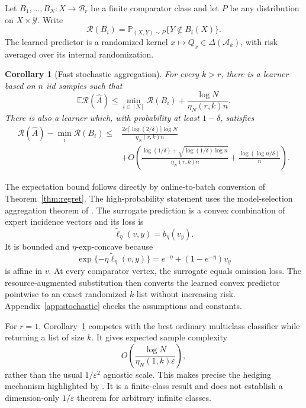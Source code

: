 \documentclass{article}
\newtheorem{corollary}[theorem]{Corollary}
\theoremstyle{definition}
\theoremstyle{remark}
\newcommand{\E}{\mathbb E}
\newcommand{\Pp}{\mathbb P}
\newcommand{\cA}{\mathcal A}
\newcommand{\cY}{\mathcal Y}
\newcommand{\cB}{\mathcal B}
\newcommand{\DeltaS}{\Delta}
\newcommand{\1}{\mathbf 1}
\newcommand{\risk}{\mathcal R}
\begin{document}
Let \(B_1,\ldots,B_N:X\to\cB_r\) be a finite comparator class and let \(P\) be any distribution on \(X\times\cY\). Write \[ \risk(B_i)=\Pp_{(X,Y)\sim P}\{Y\notin B_i(X)\}. \] The learned predictor is a randomized kernel \(x\mapsto Q_x\in\DeltaS(\cA_k)\), with risk averaged over its internal randomization.

\begin{corollary}[Fast stochastic aggregation]
\label{cor:stochastic}
For every \(k>r\), there is a learner based on \(n\) iid samples such that
\begin{equation}
\label{eq:expected-fast}
\E\risk(\widehat A)
\le\min_{i\in[N]}\risk(B_i)
+\frac{\log N}{\eta_N(r,k)n}.
\end{equation}
There is also a learner which, with probability at least \(1-\delta\), satisfies
\begin{align}
\risk(\widehat A)-\min_i\risk(B_i)
\le {}&
\frac{2e\lceil\log(2/\delta)\rceil\log N}
{\eta_N(r,k)n}
\nonumber\\
&+O\left(
\frac{\log(1/\delta)+\sqrt{\log(1/\delta)\log n}}
{\eta_N(r,k)n}
+\frac{\log(\log n/\delta)}n
\right).
\label{eq:highprob-fast}
\end{align}
\end{corollary}

The expectation bound follows directly by online-to-batch conversion of Theorem~\ref{thm:regret}. The high-probability statement uses the model-selection aggregation theorem of \citet{mehta2017fast}. The surrogate prediction is a convex combination of expert incidence vectors and its loss is \[ \widetilde\ell_\eta(v,y)=b_\eta(v_y). \] It is bounded and \(\eta\)-exp-concave because \[ \exp\{-\eta\widetilde\ell_\eta(v,y)\} =e^{-\eta}+(1-e^{-\eta})v_y \] is affine in \(v\). At every comparator vertex, the surrogate equals omission loss. The resource-augmented substitution then converts the learned convex predictor pointwise to an exact randomized \(k\)-list without increasing risk. Appendix~\ref{app:stochastic} checks the assumptions and constants.

For \(r=1\), Corollary~\ref{cor:stochastic} competes with the best ordinary multiclass classifier while returning a list of size \(k\). It gives expected sample complexity \[ O\left(\frac{\log N}{\eta_N(1,k)\varepsilon}\right), \] rather than the usual \(1/\varepsilon^2\) agnostic scale. This makes precise the hedging mechanism highlighted by \citet{pabbaraju2026optimal}. It is a finite-class result and does not establish a dimension-only \(1/\varepsilon\) theorem for arbitrary infinite classes.
\end{document}
